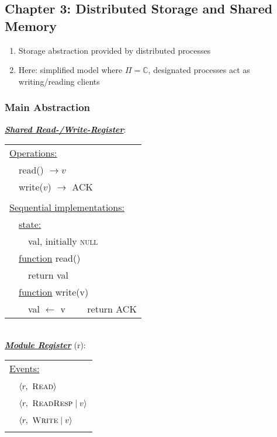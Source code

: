 \documentclass{article}
\begin{document}
	\begin{adjustwidth}{2em}{2em}
		\subsection{Chapter 3: Distributed Storage and Shared Memory}
		\begin{adjustwidth}{2em}{2em}
			\begin{enumerate}[-]
				\item Storage abstraction provided by distributed processes
				\item Here: simplified model where $\Pi = \mathbb{C}$, designated processes act as  writing/reading clients
			\end{enumerate}
			\subsubsection{Main Abstraction}
			\begin{adjustwidth}{2em}{}
				\underline{\textbf{\textit{Shared Read-/Write-Register}}}: \\
				\begin{tabular}{l}
					\underline{Operations:} \\
					\ \ read() $\rightarrow v$ \\
					\ \ write($v$) $\rightarrow$ ACK \\
					\\
					\underline{Sequential implementations:} \\
					\ \ \underline{state:} \\
					\ \ \ \ val, initially \textsc{null} \\
					\ \ \underline{function} read() \\
					\ \ \ \ return val \\
					\ \ \underline{function} write(v) \\
					\ \ \ \ val $\leftarrow$ v
					\ \ \ \ return ACK
				\end{tabular}
				\hfill \\
				\underline{\textbf{\textit{Module Register}}} (r): \\
				\begin{tabular}{l}
					\underline{Events:} \\
					\ \ $\langle r, \textsc{ Read} \rangle$ \\
					\ \ $\langle r, \textsc{ ReadResp} \mid v \rangle$ \\
					\ \ $\langle r, \textsc{ Write} \mid v \rangle$ \\\\

\end{tabular}
\end{adjustwidth}
\end{adjustwidth}
\end{adjustwidth}
\end{document}
